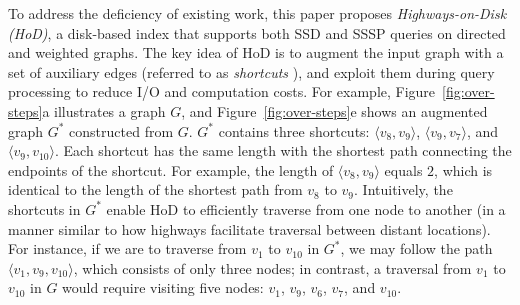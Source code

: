 \documentclass{sig-alternate}
\def\figcapup{\vspace{-2mm}}
\def\figcapdown{\vspace{-3mm}}
\def\vgap{\vspace{0mm}}
\def\G{G^*}
\begin{document}
\begin{sloppy}




\vgap

To address the deficiency of existing work, this paper proposes {\em Highways-on-Disk (HoD)}, a disk-based index that supports both SSD and SSSP queries on directed and weighted graphs. The key idea of HoD is to augment the input graph with a set of auxiliary edges (referred to as {\em shortcuts} \cite{ss05}), and exploit them during query processing to reduce I/O and computation costs. For example, Figure~\ref{fig:over-steps}a illustrates a graph $G$, and Figure~\ref{fig:over-steps}e shows an augmented graph $\G$ constructed from $G$. $\G$ contains three shortcuts: $\langle v_8, v_9\rangle$, $\langle v_9, v_7\rangle$, and $\langle v_9, v_{10}\rangle$. Each shortcut has the same length with the shortest path connecting the endpoints of the shortcut. For example, the length of $\langle v_8, v_9\rangle$ equals $2$, which is identical to the length of the shortest path from $v_8$ to $v_9$. Intuitively, the shortcuts in $\G$ enable HoD to efficiently traverse from one node to another (in a manner similar to how highways facilitate traversal between distant locations). For instance, if we are to traverse from $v_1$ to $v_{10}$ in $\G$, we may follow the path $\langle v_1, v_9, v_{10}\rangle$, which consists of only three nodes; in contrast, a traversal from $v_1$ to $v_{10}$ in $G$ would require visiting five nodes: $v_1$, $v_9$, $v_6$, $v_7$, and $v_{10}$.


\end{sloppy}
\end{document}
